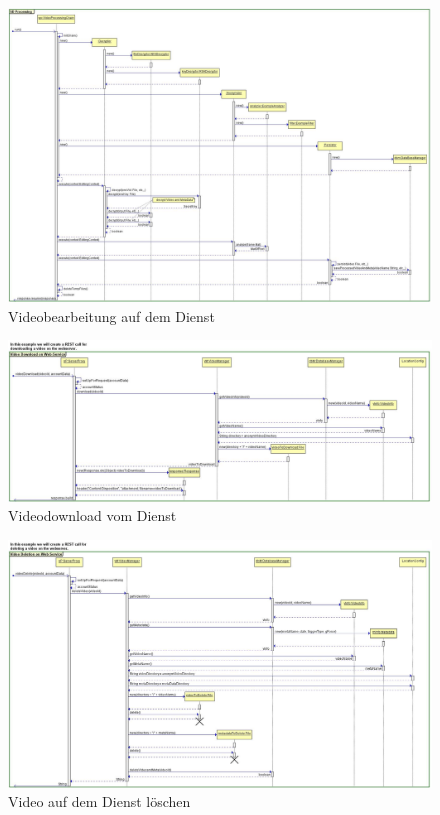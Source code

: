 \begin{figure}[ht]
	\centering
\includegraphics[width=1\textwidth]{./resources/Diagramme/Webservice/Processing.jpg}
\caption{Videobearbeitung auf dem Dienst}
	\label{fig:ServiceProcess}
\end{figure}

\begin{figure}[ht]
	\centering
\includegraphics[width=1\textwidth]{./resources/Diagramme/Webservice/SeqVideoDownload.jpg}
\caption{Videodownload vom Dienst}
	\label{fig:ServiceDownl}
\end{figure}

\begin{figure}[ht]
	\centering
\includegraphics[width=1\textwidth]{./resources/Diagramme/Webservice/SeqVideoDeletion.jpg}
\caption{Video auf dem Dienst löschen}
	\label{fig:ServiceDel}
\end{figure}